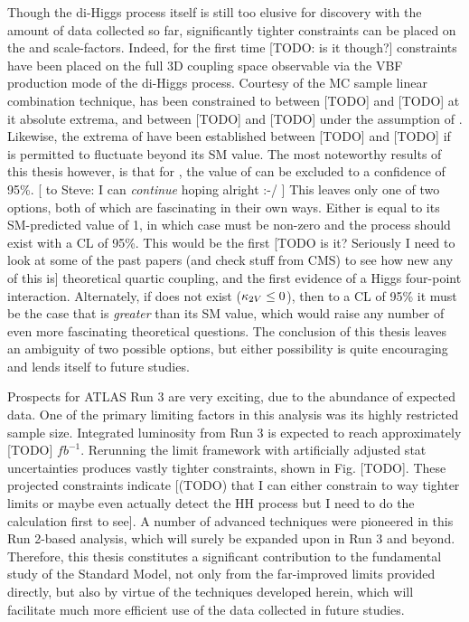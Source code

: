 Though the di-Higgs process itself is still too elusive for discovery with the amount of data collected so far,
    significantly tighter constraints can be placed on the \kvv and \kl scale-factors.
Indeed, for the first time [TODO: is it though?] constraints have been placed on the full
    3D coupling space observable via the VBF production mode of the di-Higgs process.
Courtesy of the MC sample linear combination technique,
    \kl has been constrained to between [TODO] and [TODO] at it absolute extrema,
    and between [TODO] and [TODO] under the assumption of .
Likewise, the extrema of \kvv have been established between [TODO] and [TODO] if \kl is permitted to fluctuate beyond its SM value.
The most noteworthy results of this thesis however, is that for ,
    the value of  can be excluded to a confidence of 95\%. [ to Steve: I can \textit{continue} hoping alright :-/ ]
This leaves only one of two options, both of which are fascinating in their own ways.
Either \kl is equal to its SM-predicted value of 1,
    in which case \kvv must be non-zero and the \HHVV process should exist with a CL of 95\%.
This would be the first
    [TODO is it? Seriously I need to look at some of the past papers (and check stuff from CMS) to see how new any of this is]
    theoretical quartic coupling,
    and the first evidence of a Higgs four-point interaction.
Alternately, if \kvv does not exist ($\kappa_{2V} \leq 0$), then to a CL of 95\% it must be the case
    that \kl is \textit{greater} than its SM value, which would raise any number of even more fascinating theoretical questions.
The conclusion of this thesis leaves an ambiguity of two possible options,
    but either possibility is quite encouraging and lends itself to future studies.

Prospects for ATLAS Run 3 are very exciting, due to the abundance of expected data.
One of the primary limiting factors in this analysis was its highly restricted sample size.
Integrated luminosity from Run 3 is expected to reach approximately [TODO] $\textit{fb}^{-1}$.
Rerunning the limit framework with artificially adjusted stat uncertainties produces vastly tighter constraints,
    shown in Fig. [TODO].
These projected constraints indicate [(TODO) that I can either constrain to way tighter limits or maybe even actually detect the HH process
    but I need to do the calculation first to see].
A number of advanced techniques were pioneered in this Run 2-based analysis,
    which will surely be expanded upon in Run 3 and beyond.
Therefore, this thesis constitutes a significant contribution to the fundamental study of the Standard Model,
    not only from the far-improved limits provided directly,
    but also by virtue of the techniques developed herein,
    which will facilitate much more efficient use of the data collected in future studies.


